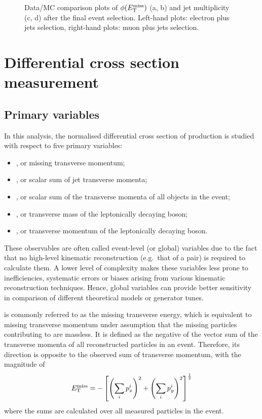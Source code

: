\begin{figure}[htbp]
    \caption{Data/MC comparison plots of $\phi(E_{\mathrm{T}}^{\textrm{miss}})$ (a, b) and jet multiplicity (c, d) after the final event
    selection. Left-hand plots: electron plus jets selection, right-hand plots: muon plus jets selection.}
    \label{fig:contol_plots_phiMET_NJets}
\end{figure}

\newpage

\section{Differential cross section measurement}
\label{s_xsection:measurement}

\subsection{Primary variables}
\label{ss_xsection:variables}

In this analysis, the normalised differential cross section of \ttbar production is studied with respect to five primary
variables:

\begin{itemize}
	\item \MET, or missing transverse momentum;
	\item \HT, or scalar sum of jet transverse momenta;
	\item \ST, or scalar sum of the transverse momenta of all objects in the event;
	\item \MT, or transverse mass of the leptonically decaying \W boson;
	\item \WPT, or transverse momentum of the leptonically decaying \W boson.
\end{itemize}

These observables are often called event-level (or global) variables due to the fact that no high-level kinematic
reconstruction (e.g.\ that of a \ttbar pair) is required to calculate them. A lower level of complexity makes these
variables less prone to inefficiencies, systematic errors or biases arising from various kinematic reconstruction
techniques. Hence, global variables can provide better sensitivity in comparison of different theoretical models or
generator tunes.

\MET is commonly referred to as the missing transverse energy, which is equivalent to missing transverse momentum under
assumption that the missing particles contributing to \MET are massless. It is defined as the negative of the vector sum
of the transverse momenta of all reconstructed particles in an event. Therefore, its direction is opposite to the
observed sum of transverse momentum, with the magnitude of
\[ E_{\mathrm{T}}^{\textrm{miss}} = - \left[ \left(\sum_i{p_{x}^i}\right)^2 + \left(\sum_i{p_{y}^i}\right)^2 \right]^{\frac{1}{2}}\]
where the sums are calculated over all measured particles in the event.

